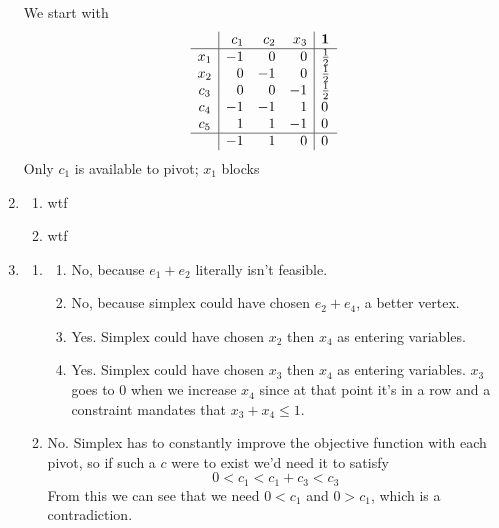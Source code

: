 \documentclass[12pt]{article}
\begin{document}
\begin{enumerate}
            We start with
            \[\begin{array}{c|rrr|l}
                            & c_1 & c_2 & x_3 & \mathbf{1}  \\ \hline
                        x_1 & -1  & 0   & 0   & \frac{1}{2} \\
                        x_2 & 0   & -1  & 0   & \frac{1}{2} \\
                        c_3 & 0   & 0   & -1  & \frac{1}{2} \\
                        c_4 & -1  & -1  & 1   & 0           \\
                        c_5 & 1   & 1   & -1  & 0           \\ \hline
                            & -1  & 1   & 0   & 0           \\
                  \end{array}\]
            Only $c_1$ is available to pivot; $x_1$ blocks 
      \item \begin{enumerate}
            \item wtf
            \item wtf
      \end{enumerate}
      \item \begin{enumerate}
                  \item \begin{enumerate}
                              \item No, because $e_1+e_2$ literally isn't feasible.
                              \item No, because simplex could have chosen $e_2+e_4$,
                                    a better vertex.
                              \item Yes.
                                    Simplex could have chosen $x_2$ then $x_4$ as entering variables.
                              \item Yes.
                                    Simplex could have chosen $x_3$ then $x_4$ as entering variables.
                                    $x_3$ goes to $0$ when we increase $x_4$
                                    since at that point it's in a row and a constraint mandates that $x_3+x_4 \le 1$.
                        \end{enumerate}
                  \item No.
                        Simplex has to constantly improve the objective function with each pivot,
                        so if such a $c$ were to exist we'd need it to satisfy
                        \[0 < c_1 < c_1 + c_3 < c_3\]
                        From this we can see that we need $0<c_1$ and $0>c_1$, which is a contradiction.
            \end{enumerate}
\end{enumerate}
\end{document}

